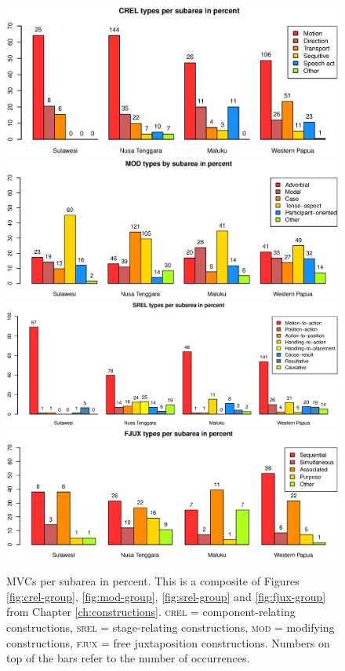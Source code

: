 \begin{figure}
\begin{minipage}{1.0\textwidth}
\includegraphics[width=.5\columnwidth]{figures/CREL_Group.eps}
\includegraphics[width=.5\columnwidth]{figures/MOD_Group.eps}
\includegraphics[width=.5\columnwidth]{figures/SREL_Group.eps}
\includegraphics[width=.5\columnwidth]{figures/FJUX_group.eps}
\caption[MVCs per subarea in percent]{MVCs per subarea in percent. This is a composite of Figures \ref{fig:crel-group}, \ref{fig:mod-group}, \ref{fig:srel-group} and \ref{fig:fjux-group} from Chapter \ref{ch:constructions}. \textsc{crel} = component-relating constructions, \textsc{srel} = stage-relating constructions, \textsc{mod} = modifying constructions, \textsc{fjux} = free juxtaposition constructions. Numbers on top of the bars refer to the number of occurrences.}\label{fig:MVCs_subarea}
\end{minipage}
\end{figure}

